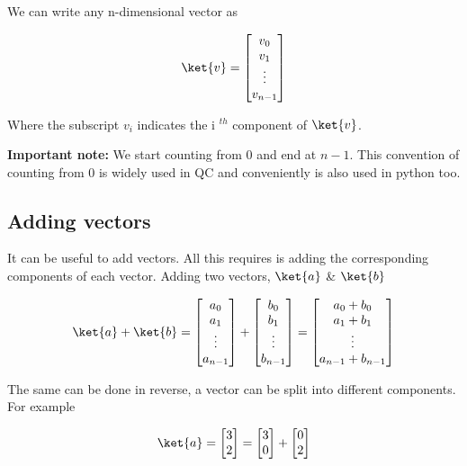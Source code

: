 \documentclass{book}
\begin{document}
We can write any n-dimensional vector as

$$
\ket{v} = \begin{bmatrix} v_0 \\ v_1 \\ \vdots \\ v_{n-1} \end{bmatrix}
$$

Where the subscript $v_i$ indicates the i $^{th}$ component of $\ket{v}$. 

\textbf{Important note:} We start counting from 0 and end at $n-1$. This convention of counting from 0 is widely used in QC and conveniently is also used in python too. 

\subsection{ Adding vectors }

It can be useful to add vectors. All this requires is adding the corresponding components of each vector. Adding two vectors, $\ket{a}$ \& $\ket{b}$

$$\ket{a} + \ket{b} = \begin{bmatrix} a_0 \\ a_1 \\ \vdots \\ a_{n-1} \end{bmatrix} + \begin{bmatrix} b_0 \\ b_1 \\ \vdots \\ b_{n-1} \end{bmatrix} = \begin{bmatrix} a_0 + b_0 \\ a_1 + b_1 \\ \vdots \\ a_{n-1} + b_{n-1} \end{bmatrix} $$

The same can be done in reverse, a vector can be split into different components. For example 

$$
\ket{a} = \begin{bmatrix} 3 \\ 2 \end{bmatrix} = \begin{bmatrix} 3 \\ 0 \end{bmatrix} + \begin{bmatrix} 0 \\ 2 \end{bmatrix}
$$
\end{document}
